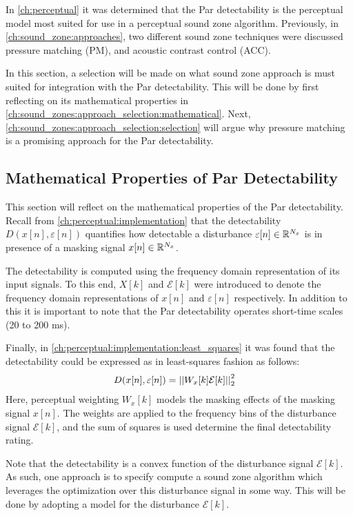In \autoref{ch:perceptual} it was determined that the Par detectability is the perceptual model most suited for use in a 
perceptual sound zone algorithm.
Previously, in \autoref{ch:sound_zone:approaches}, two different sound zone techniques were discussed 
pressure matching (PM), and acoustic contrast control (ACC). 

In this section, a selection will be made on what sound zone approach is must suited for integration with the Par
detectability.
This will be done by first reflecting on its mathematical properties in \autoref{ch:sound_zones:approach_selection:mathematical}.
Next, \autoref{ch:sound_zones:approach_selection:selection} will argue why pressure matching is a promising approach for 
the Par detectability.

\subsection{Mathematical Properties of Par Detectability}
\label{ch:sound_zones:approach_selection:mathematical}
This section will reflect on the mathematical properties of the Par detectability.
Recall from \autoref{ch:perceptual:implementation} that the detectability $D(x[n],\varepsilon[n])$ quantifies how detectable a disturbance
$\varepsilon[n]\in\mathbb{R}^{N_x}$ is in presence of a masking signal $x[n]\in\mathbb{R}^{N_x}$.

The detectability is computed using the frequency domain representation of its input signals.
To this end, $X[k]$ and $\mathcal{E}[k]$ were introduced to denote the frequency domain representations of $x[n]$ and $\varepsilon[n]$ respectively.
In addition to this it is important to note that the Par detectability operates short-time scales (20 to 200 ms).

Finally, in \autoref{ch:perceptual:implementation:least_squares} it was found that the detectability could be expressed as in least-squares fashion as follows:
\begin{align}
    D(x[n],\varepsilon[n]) &= \norm[2][2]{W_x[k]\mathcal{E}[k]} 
\end{align}
Here, perceptual weighting $W_x[k]$ models the masking effects of the masking signal $x[n]$.
The weights are applied to the frequency bins of the disturbance signal $\mathcal{E}[k]$, and the sum of squares is used determine the final detectability rating.

Note that the detectability is a convex function of the disturbance signal $\mathcal{E}[k]$. 
As such, one approach is to specify compute a sound zone algorithm which leverages the optimization over this disturbance signal in some way.
This will be done by adopting a model for the disturbance $\mathcal{E}[k]$.

